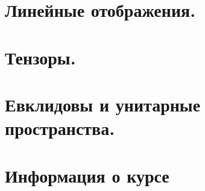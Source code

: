 \maketitle
\tableofcontents
\newpage
\section{Линейные отображения.}

\newpage
\section{Тензоры.}

\newpage
\section{Евклидовы и унитарные пространства.}

\newpage
\section{Информация о курсе}

